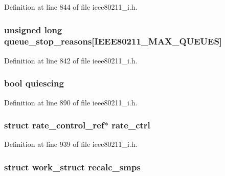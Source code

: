 Definition at line 844 of file ieee80211\-\_\-i.\-h.

\hypertarget{structieee80211__local_a4ac9818da187bbf4f141fd9e6ca1f0fd}{
\subsubsection[{queue\-\_\-stop\-\_\-reasons}]{\setlength{\rightskip}{0pt plus 5cm}unsigned long queue\-\_\-stop\-\_\-reasons\mbox{[}I\-E\-E\-E80211\-\_\-\-M\-A\-X\-\_\-\-Q\-U\-E\-U\-E\-S\mbox{]}}}\label{structieee80211__local_a4ac9818da187bbf4f141fd9e6ca1f0fd}


Definition at line 842 of file ieee80211\-\_\-i.\-h.

\hypertarget{structieee80211__local_a4938b434be86b4b137b6eec047203e65}{
\subsubsection[{quiescing}]{\setlength{\rightskip}{0pt plus 5cm}bool quiescing}}\label{structieee80211__local_a4938b434be86b4b137b6eec047203e65}


Definition at line 890 of file ieee80211\-\_\-i.\-h.

\hypertarget{structieee80211__local_a0f6ac21a75ada1908328210ec3b42667}{
\subsubsection[{rate\-\_\-ctrl}]{\setlength{\rightskip}{0pt plus 5cm}struct {\bf rate\-\_\-control\-\_\-ref}$\ast$ rate\-\_\-ctrl}}\label{structieee80211__local_a0f6ac21a75ada1908328210ec3b42667}


Definition at line 939 of file ieee80211\-\_\-i.\-h.

\hypertarget{structieee80211__local_a1b89bbd9d7e4daee680c064bed613ff7}{
\subsubsection[{recalc\-\_\-smps}]{\setlength{\rightskip}{0pt plus 5cm}struct work\-\_\-struct recalc\-\_\-smps}}\label{structieee80211__local_a1b89bbd9d7e4daee680c064bed613ff7}


